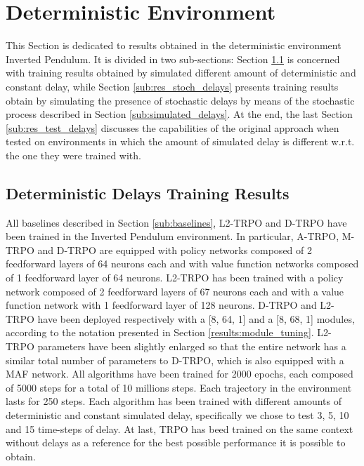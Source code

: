     \section{Deterministic Environment}
    \label{results:deterministic}
        This Section is dedicated to results obtained in the deterministic environment Inverted Pendulum. It is divided in two sub-sections: Section \ref{sub:res_det_delays} is concerned with training results obtained by simulated different amount of deterministic and constant delay, while Section \ref{sub:res_stoch_delays} presents training results obtain by simulating the presence of stochastic delays by means of the stochastic process described in Section \ref{sub:simulated_delays}. At the end, the last Section \ref{sub:res_test_delays} discusses the capabilities of the original approach when tested on environments in which the amount of simulated delay is different w.r.t. the one they were trained with. 
        
        \subsection{Deterministic Delays Training Results}
        \label{sub:res_det_delays}
            All baselines described in Section \ref{sub:baselines}, L2-TRPO and D-TRPO have been trained in the Inverted Pendulum environment. In particular, A-TRPO, M-TRPO and D-TRPO are equipped with policy networks composed of 2 feedforward layers of 64 neurons each and with value function networks composed of 1 feedforward layer of 64 neurons. L2-TRPO has been trained with a policy network composed of 2 feedforward layers of 67 neurons each and with a value function network with 1 feedforward layer of 128 neurons. D-TRPO and L2-TRPO have been deployed respectively with a [8, 64, 1] and a [8, 68, 1] modules, according to the notation presented in Section \ref{results:module_tuning}. L2-TRPO parameters have been slightly enlarged so that the entire network has a similar total number of parameters to D-TRPO, which is also equipped with a MAF network. All algorithms have been trained for 2000 epochs, each composed of 5000 steps for a total of 10 millions steps. Each trajectory in the environment lasts for 250 steps. Each algorithm has been trained with different amounts of deterministic and constant simulated delay, specifically we chose to test 3, 5, 10 and 15 time-steps of delay. At last, TRPO has beed trained on the same context without delays as a reference for the best possible performance it is possible to obtain.
            
